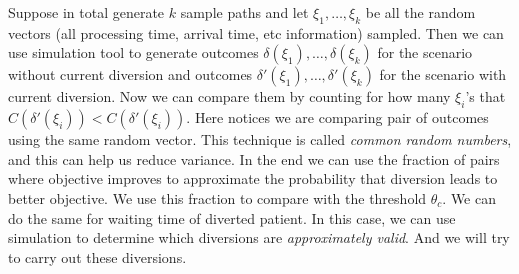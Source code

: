 Suppose in total generate $k$ sample paths and let $\xi_1, \ldots, \xi_k$ be all the random vectors (all processing time, arrival time, etc information) sampled. Then we can use simulation tool to generate outcomes $\delta(\xi_1), \ldots, \delta(\xi_k)$ for the scenario without current diversion and outcomes $\delta'(\xi_1), \ldots, \delta'(\xi_k)$ for the scenario with current diversion. Now we can compare them by counting for how many $\xi_i$'s that $C(\delta'(\xi_i)) < C(\delta'(\xi_i))$. Here notices we are comparing pair of outcomes using the same random vector. This technique is called \textit{common random numbers}, and this can help us reduce variance. In the end we can use the fraction of pairs where objective improves to approximate the probability that diversion leads to better objective. We use this fraction to compare with the threshold $\theta_c$. We can do the same for waiting time of diverted patient. In this case, we can use simulation to determine which diversions are \textit{approximately valid}. And we will try to carry out these diversions.
